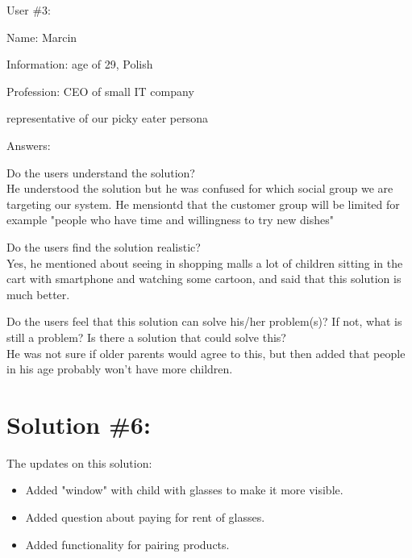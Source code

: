\documentclass[a4paper,10pt,oneside]{scrreprt}
\begin{document}
User \#3:
\begin{compactitem}
	\item Name: Marcin
	\item Information: age of 29, Polish
	\item Profession: CEO of small IT company 
	\item representative of our picky eater persona
\end{compactitem}
\bigskip

Answers:
\begin{compactitem}
	\item Do the users understand the solution?\\
	 He understood the solution but he was confused for which social group we are targeting our system. He mensiontd that the customer group will be limited for example "people who have time and willingness to try new dishes"\\

	\item Do the users find the solution realistic?\\
	Yes, he mentioned about seeing in shopping malls a lot of children sitting in the cart with smartphone and watching some cartoon, and said that this solution is much better.\\

	\item Do the users feel that this solution can solve his/her problem(s)? If not, what is still
	a problem? Is there a solution that could solve this?\\
	He was not sure if older parents would agree to this, but then added that people in his age probably won't have more children.
\end{compactitem}

\clearpage


\bigskip
\clearpage

\section{Solution \#6:}
The updates on this solution:
\begin{itemize}
	\item Added "window" with child with glasses to make it more visible.
	\item Added question about paying for rent of glasses.
	\item Added functionality for pairing products.

\end{itemize}
\end{document}
